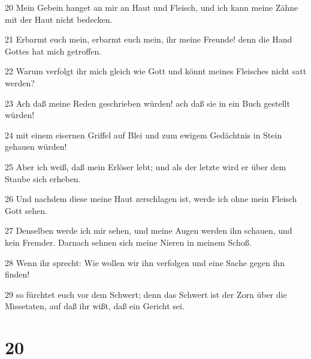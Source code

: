 \par 20 Mein Gebein hanget an mir an Haut und Fleisch, und ich kann meine Zähne mit der Haut nicht bedecken.
\par 21 Erbarmt euch mein, erbarmt euch mein, ihr meine Freunde! denn die Hand Gottes hat mich getroffen.
\par 22 Warum verfolgt ihr mich gleich wie Gott und könnt meines Fleisches nicht satt werden?
\par 23 Ach daß meine Reden geschrieben würden! ach daß sie in ein Buch gestellt würden!
\par 24 mit einem eisernen Griffel auf Blei und zum ewigem Gedächtnis in Stein gehauen würden!
\par 25 Aber ich weiß, daß mein Erlöser lebt; und als der letzte wird er über dem Staube sich erheben.
\par 26 Und nachdem diese meine Haut zerschlagen ist, werde ich ohne mein Fleisch Gott sehen.
\par 27 Denselben werde ich mir sehen, und meine Augen werden ihn schauen, und kein Fremder. Darnach sehnen sich meine Nieren in meinem Schoß.
\par 28 Wenn ihr sprecht: Wie wollen wir ihn verfolgen und eine Sache gegen ihn finden!
\par 29 so fürchtet euch vor dem Schwert; denn das Schwert ist der Zorn über die Missetaten, auf daß ihr wißt, daß ein Gericht sei.

\chapter{20}

